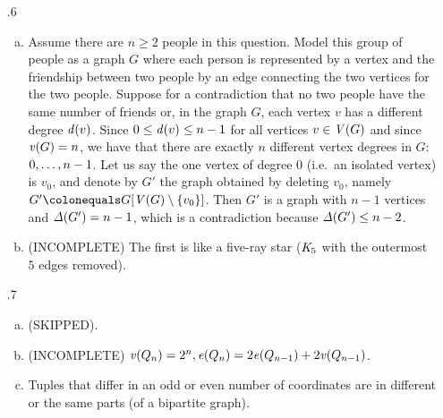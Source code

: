 \begin{enumerate}[1.]
\begin{description}
\end{description}
%
\item[\thesection.6]
\begin{enumerate}[a)]
\item Assume there are $n \geq 2$ people in this question. Model this group of people as a graph $G$ where each person is represented by a vertex and the friendship between two people by an edge connecting the two vertices for the two people. Suppose for a contradiction that no two people have the same number of friends or, in the graph $G$, each vertex $v$ has a different degree $\mathit{d}(v)$. Since $0 \leq \mathit{d}(v) \leq n - 1$ for all vertices $v \in \mathit{V}(G)$ and since $\mathit{v}(G) = n$, we have that there are exactly $n$ different vertex degrees in $G$: $0, \ldots, n - 1$. Let us say the one vertex of degree $0$ (i.e.~an isolated vertex) is $v_0$, and denote by $G'$ the graph obtained by deleting $v_0$, namely $G' \defas \subgraph{G}{\vset(G) \setminus \sete{v_0}}$. Then $G'$ is a graph with $n - 1$ vertices and $\mathit{\Delta}(G') = n - 1$, which is a contradiction because $\mathit{\Delta}(G') \leq n - 2$.
\item (INCOMPLETE) The first is like a five-ray star ($\clique[5]$ with the outermost $5$ edges removed).
\end{enumerate}
%
\item[\thesection.7]
\begin{enumerate}[a)]
\item (SKIPPED).
\item (INCOMPLETE) $\mathit{v}(Q_n) = 2^n, \mathit{e}(Q_n) = 2\mathit{e}(Q_{n - 1}) + 2\mathit{v}(Q_{n - 1})$.
\item Tuples that differ in an odd or even number of coordinates are in different or the same parts (of a bipartite graph).
\end{enumerate}
%
\end{enumerate}
